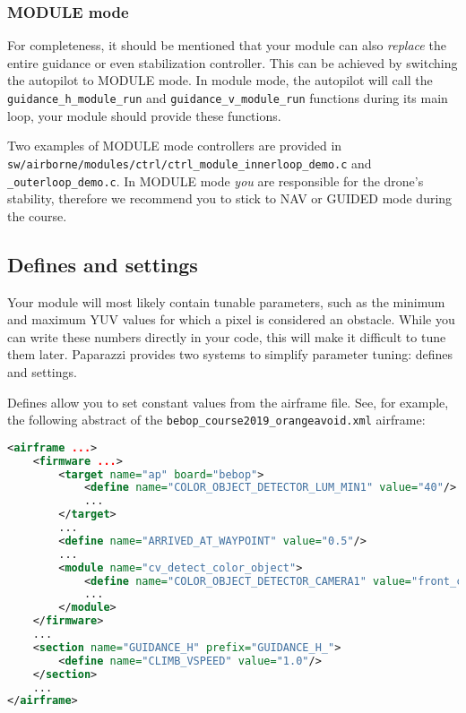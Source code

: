 \documentclass{article}
\begin{document}
\subsubsection{MODULE mode}
For completeness, it should be mentioned that your module can also \emph{replace} the entire guidance or even stabilization controller. This can be achieved by switching the autopilot to MODULE mode. In module mode, the autopilot will call the \texttt{guidance\_h\_module\_run} and \texttt{guidance\_v\_module\_run} functions during its main loop, your module should provide these functions.

Two examples of MODULE mode controllers are provided in \texttt{sw/airborne/modules/ctrl/ctrl\_module\_innerloop\_demo.c} and \texttt{\_outerloop\_demo.c}. In MODULE mode \emph{you} are responsible for the drone's stability, therefore we recommend you to stick to NAV or GUIDED mode during the course.




\subsection{Defines and settings}
Your module will most likely contain tunable parameters, such as the minimum and maximum YUV values for which a pixel is considered an obstacle. While you can write these numbers directly in your code, this will make it difficult to tune them later. Paparazzi provides two systems to simplify parameter tuning: defines and settings.

Defines allow you to set constant values from the airframe file. See, for example, the following abstract of the \texttt{bebop\_course2019\_orangeavoid.xml} airframe:
\begin{lstlisting}[language=xml]
<airframe ...>
	<firmware ...>
		<target name="ap" board="bebop">
			<define name="COLOR_OBJECT_DETECTOR_LUM_MIN1" value="40"/>
			...
		</target>
		...
		<define name="ARRIVED_AT_WAYPOINT" value="0.5"/>
		...
		<module name="cv_detect_color_object">
			<define name="COLOR_OBJECT_DETECTOR_CAMERA1" value="front_camera"/>
			...
		</module>
	</firmware>
	...
	<section name="GUIDANCE_H" prefix="GUIDANCE_H_">
		<define name="CLIMB_VSPEED" value="1.0"/>
	</section>
	...
</airframe>
\end{lstlisting}
\end{document}
